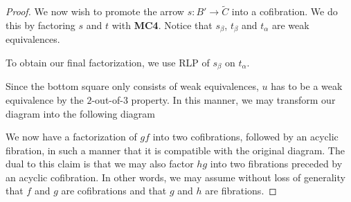 \documentclass[../thesis.tex]{subfiles}
\begin{document}
\begin{proof}
                We now wish to promote the arrow $s: B'\rightarrow \widetilde{C}$ into a cofibration. We do this by factoring $s$ and $t$ with \textbf{MC4}. Notice that $s_\beta$, $t_\beta$ and $t_\alpha$ are weak equivalences.
                \begin{center}
                \end{center}

                To obtain our final factorization, we use RLP of $s_\beta$ on $t_\alpha$.
                \begin{center}
                \end{center}

                Since the bottom square only consists of weak equivalences, $u$ has to be a weak equivalence by the $2$-out-of-$3$ property. In this manner, we may transform our diagram into the following diagram
                \begin{center}
                \end{center}
                We now have a factorization of $gf$ into two cofibrations, followed by an acyclic fibration, in such a manner that it is compatible with the original diagram. The dual to this claim is that we may also factor $hg$ into two fibrations preceded by an acyclic cofibration. In other words, we may assume without loss of generality that $f$ and $g$ are cofibrations and that $g$ and $h$ are fibrations.
                

\end{proof}
\end{document}
